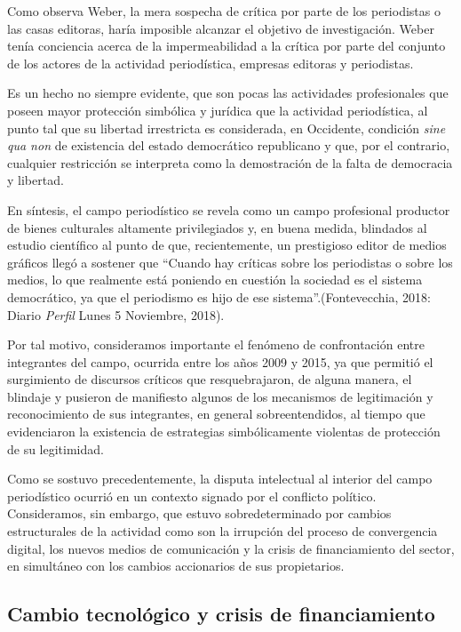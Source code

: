 Como observa Weber, la mera sospecha de crítica por parte de los periodistas o las casas editoras, haría imposible alcanzar el objetivo de investigación. Weber tenía conciencia acerca de la impermeabilidad a la crítica por parte del conjunto de los actores de la actividad periodística, empresas editoras y periodistas.

Es un hecho no siempre evidente, que son pocas las actividades profesionales que poseen mayor protección simbólica y jurídica que la actividad periodística, al punto tal que su libertad irrestricta es considerada, en Occidente, condición \emph{sine qua non} de existencia del estado democrático republicano y que, por el contrario, cualquier restricción se interpreta como la demostración de la falta de democracia y libertad.

En síntesis, el campo periodístico se revela como un campo profesional productor de bienes culturales altamente privilegiados y, en buena medida, blindados al estudio científico al punto de que, recientemente, un prestigioso editor de medios gráficos llegó a sostener que \enquote{Cuando hay críticas sobre los periodistas o sobre los medios, lo que realmente está poniendo en cuestión la sociedad es el sistema democrático, ya que el periodismo es hijo de ese sistema}.(Fontevecchia, 2018: Diario \emph{Perfil} Lunes 5 Noviembre, 2018).

Por tal motivo, consideramos importante el fenómeno de confrontación entre integrantes del campo, ocurrida entre los años 2009 y 2015, ya que permitió el surgimiento de discursos críticos que resquebrajaron, de alguna manera, el blindaje y pusieron de manifiesto algunos de los mecanismos de legitimación y reconocimiento de sus integrantes, en general sobreentendidos, al tiempo que evidenciaron la existencia de estrategias simbólicamente violentas de protección de su legitimidad.

Como se sostuvo precedentemente, la disputa intelectual al interior del campo periodístico ocurrió en un contexto signado por el conflicto político. Consideramos, sin embargo, que estuvo sobredeterminado por cambios estructurales de la actividad como son la irrupción del proceso de convergencia digital, los nuevos medios de comunicación y la crisis de financiamiento del sector, en simultáneo con los cambios accionarios de sus propietarios.


\subsection{Cambio tecnológico y crisis de financiamiento}


